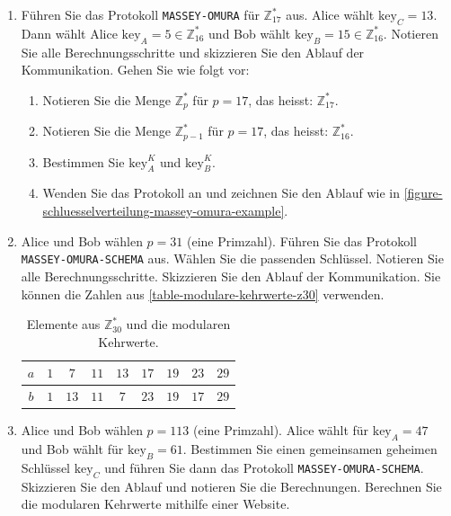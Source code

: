 \begin{enumerate}
	\item Führen Sie das Protokoll \texttt{MASSEY-OMURA} für $\mathbb{Z}_{17}^*$ aus. Alice wählt $\text{key}_C = 13$. Dann wählt Alice $\text{key}_A = 5 \in \mathbb{Z}_{16}^*$ und Bob wählt $\text{key}_B = 15 \in \mathbb{Z}_{16}^*$. Notieren Sie alle Berechnungsschritte und skizzieren Sie den Ablauf der Kommunikation. Gehen Sie wie folgt vor:
	\begin{enumerate}
	\item Notieren Sie die Menge $\mathbb{Z}_{p}^*$ für $p = 17$, das heisst: $\mathbb{Z}_{17}^*$.
	\item Notieren Sie die Menge $\mathbb{Z}_{p-1}^*$ für $p = 17$, das heisst: $\mathbb{Z}_{16}^*$.
	\item Bestimmen Sie $\text{key}_A^K$ und $\text{key}_B^K$.
	\item Wenden Sie das Protokoll an und zeichnen Sie den Ablauf wie in \autoref{figure-schluesselverteilung-massey-omura-example}.
	\end{enumerate}
	
	
	\newpage
	
	\item Alice und Bob wählen $p = 31$ (eine Primzahl). Führen Sie das Protokoll \texttt{MASSEY-OMURA-SCHEMA} aus. Wählen Sie die passenden Schlüssel. Notieren Sie alle Berechnungsschritte. Skizzieren Sie den Ablauf der Kommunikation. Sie können die Zahlen aus \autoref{table-modulare-kehrwerte-z30} verwenden.

\begin{table}[htb]
\centering
\begin{tabular}{|c|c|c|c|c|c|c|c|c|}
\hline
$a$                         & $1$ & $7$  & $11$ & $13$ & $17$ & $19$ & $23$ & $29$ \\ \hline
$b$ & $1$ & $13$ & $11$ & $7$ & $23$ & $19$ & $17$ & $29$ \\ \hline
\end{tabular}
\caption{Elemente aus $\mathbb{Z}_{30}^*$ und die modularen Kehrwerte.}
\label{table-modulare-kehrwerte-z30}
\end{table}

	
	\newpage

	\item Alice und Bob wählen $p = 113$ (eine Primzahl). Alice wählt für $\text{key}_A = 47$ und Bob wählt für $\text{key}_B = 61$. Bestimmen Sie einen gemeinsamen geheimen Schlüssel $\text{key}_C$ und führen Sie dann das Protokoll \texttt{MASSEY-OMURA-SCHEMA}. Skizzieren Sie den Ablauf und notieren Sie die Berechnungen. Berechnen Sie die modularen Kehrwerte mithilfe einer Website.
\end{enumerate}

